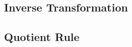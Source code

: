 \documentclass[11pt,a4paper]{article}
\begin{document}
\subsection{Inverse Transformation}







\subsection{Quotient Rule}




























\end{document}
